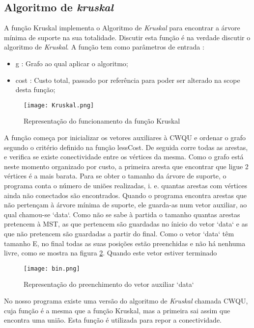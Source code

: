 \documentclass[14pt]{article}
\begin{document}
    \subsection[Kruskal]{Algoritmo de \emph{kruskal}}
    A função Kruskal implementa o Algoritmo de \emph{Kruskal} para encontrar a árvore mínima de suporte na sua totalidade. Discutir esta função é
    na verdade discutir o algoritmo de \emph{Kruskal}. A função tem como parâmetros de entrada :
    \begin{itemize}
        \item g : Grafo ao qual aplicar o algoritmo;
        \item cost : Custo total, passado por referência para poder ser alterado na scope desta função;
    \end{itemize}
    \begin{figure}[H]
        \centenring
        \texttt{[image: Kruskal.png]}
        \caption {Representação do funcionamento da função Kruskal}
        \label{fig:kruskal}
    \end{figure}
    A função começa por inicializar os vetores auxiliares à CWQU e ordenar o grafo segundo o critério definido na função lessCost.
    De seguida corre todas as arestas, e verifica se existe conectividade entre os vértices da mesma.
    Como o grafo está neste momento organizado por custo, a primeira aresta que encontrar que ligue 2 vértices é a mais barata.
    Para se obter o tamanho da árvore de suporte, o programa conta o número de uniões realizadas, i. e. quantas arestas com vértices
    ainda não conectados são encontrados.
    Quando o programa encontra arestas que não pertençam à árvore mínima de suporte, ele guarda-as num vetor auxiliar, ao qual chamou-se `data`.
    Como não se sabe à partida o tamanho quantas arestas pretencem à MST, as que pertencem são guardadas no ínicio do vetor `data` e as que não
    pretencem são guardadas a partir do final.
    Como o vetor `data` têm tamanho E, no final todas as suas posições estão preenchidas e não há nenhuma livre, como se mostra na figura \ref{fig:bin}. Quando este vetor estiver terminado
    \begin{figure}[H]
           \centering
           \texttt{[image: bin.png]}
           \caption{Representação do preenchimento do vetor auxiliar `data`}
           \label{fig:bin}
    \end{figure}

    No nosso programa existe uma versão do algoritmo de \emph{Kruskal} chamada CWQU, cuja função é a mesma que a função Kruskal, mas a primeira
    sai assim que encontra uma união. Esta função é utilizada para repor a conectividade.
\end{document}
